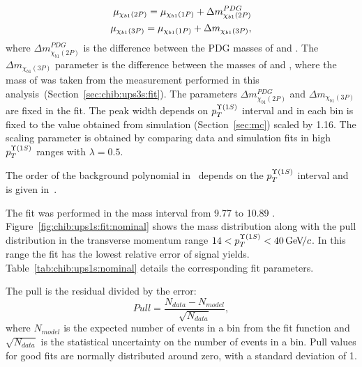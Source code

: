 \begin{equation}
  \begin{aligned}
\mu_{\chi_{b 1}(2P)} = \mu_{\chi_{b 1}(1P)} + \Delta m_{\chi_{b1}(2P)}^{PDG} \\
\mu_{\chi_{b 1}(3P)} = \mu_{\chi_{b 1}(1P)} + \Delta m_{\chi_{b1}(3P)}, \\
  \end{aligned}
\end{equation}
\noindent where $\Delta m_{\chi_{b1}(2P)}^{PDG}$ is the difference between the PDG masses of
\chiboneTwoP and \chiboneOneP. The $\Delta  m_{\chi_{b1}(3P)}$ parameter is the difference
between the masses of \chiboneThreeP and \chiboneOneP, where the mass of
\chiboneThreeP was taken from the measurement performed in this 
analysis~(Section~\ref{sec:chib:ups3s:fit}). The parameters  $\Delta
m_{\chi_{b1}(2P)}^{PDG}$ and $\Delta  m_{\chi_{b1}(3P)}$ are fixed in the fit.
The  \chiboneOneP peak width depends on $p_T^{\Y1S}$ interval and in each bin is fixed to
the value obtained from simulation (Section~\ref{sec:mc}) scaled by 1.16. 
The scaling parameter is obtained by comparing data and simulation fits
in high $p_T^{\Y1S}$ ranges with $\lambda=0.5$.

The order of the background polynomial in~ depends on the
$p_{T}^{\OneS}$ interval and is given in~.



The fit was performed in the mass interval from  9.77 \gevcc to 10.89 \gevcc.
Figure~\ref{fig:chib:ups1s:fit:nominal} shows the mass distribution along with
the pull distribution in the transverse momentum range $14 < p_T^{\OneS} < 40
\gevc$. In this range the fit has the lowest relative error of signal yields. 
Table~\ref{tab:chib:ups1s:nominal} details the corresponding fit parameters.

The pull is the residual divided by the error:
\begin{equation}
\label{eq:pull}
Pull = \frac{N_{data} - N_{model}}{\sqrt{N_{data}}},
\end{equation}
\noindent where $N_{model}$ is the expected number of events in a bin from
the fit function and $\sqrt{N_{data}}$ is the statistical uncertainty on the
number of events in a bin. Pull values  for good fits are normally
distributed around zero, with a standard deviation of 1. 





